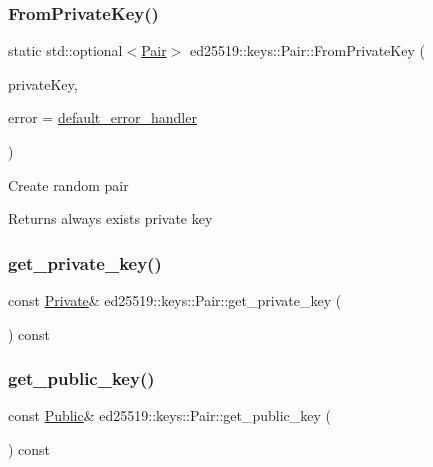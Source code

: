 \subsubsection{\texorpdfstring{From\+Private\+Key()}{FromPrivateKey()}}
{\footnotesize\ttfamily static std\+::optional$<$\mbox{\hyperlink{classed25519_1_1keys_1_1_pair}{Pair}}$>$ ed25519\+::keys\+::\+Pair\+::\+From\+Private\+Key (\begin{DoxyParamCaption}\item[{const std\+::string \&}]{private\+Key,  }\item[{const \mbox{\hyperlink{namespaceed25519_a6ba572942b3c18591fc869d52a6b16e6}{Error\+Handler}} \&}]{error = {\ttfamily \mbox{\hyperlink{namespaceed25519_a7c7bb6ed17541162959c33ed3e3b15fb}{default\+\_\+error\+\_\+handler}}} }\end{DoxyParamCaption})\hspace{0.3cm}{\ttfamily [static]}}

Create random pair \begin{DoxyReturn}{Returns}
always exists private key 
\end{DoxyReturn}
\mbox{\label{classed25519_1_1keys_1_1_pair_add9c9587c53dff8b1d5bc69a7a97f837}} 
\subsubsection{\texorpdfstring{get\+\_\+private\+\_\+key()}{get\_private\_key()}}
{\footnotesize\ttfamily const \mbox{\hyperlink{classed25519_1_1keys_1_1_private}{Private}}\& ed25519\+::keys\+::\+Pair\+::get\+\_\+private\+\_\+key (\begin{DoxyParamCaption}{ }\end{DoxyParamCaption}) const\hspace{0.3cm}{\ttfamily [inline]}}

\mbox{\label{classed25519_1_1keys_1_1_pair_aad6c01fdb3b75ce2b05e51dbc833ac72}} 
\subsubsection{\texorpdfstring{get\+\_\+public\+\_\+key()}{get\_public\_key()}}
{\footnotesize\ttfamily const \mbox{\hyperlink{classed25519_1_1keys_1_1_public}{Public}}\& ed25519\+::keys\+::\+Pair\+::get\+\_\+public\+\_\+key (\begin{DoxyParamCaption}{ }\end{DoxyParamCaption}) const\hspace{0.3cm}{\ttfamily [inline]}}

